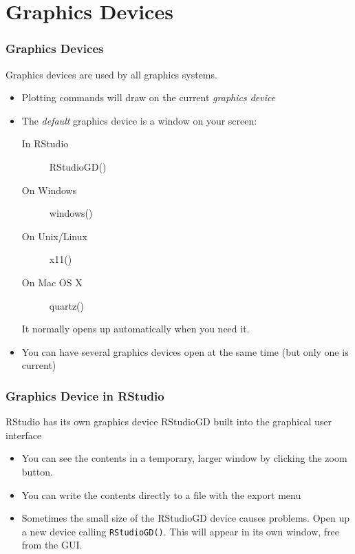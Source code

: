 \documentclass[xcolor=svgnames]{beamer}
\begin{document}
\section{Graphics Devices}

\begin{frame}
  \frametitle{Graphics Devices}
  Graphics devices are used by all graphics systems.
  \begin{itemize}      
  \item Plotting commands will draw on the current {\em graphics device}
  \item The {\em default} graphics device is a window on your screen:
  \begin{description}
  \item[In RStudio] RStudioGD()
  \item[On Windows] windows()
  \item[On Unix/Linux] x11()
  \item[On Mac OS X] quartz()
  \end{description}
  It normally opens up automatically when you need it.
  \item You can have several graphics devices open at the same time (but
    only one is current)
  \end{itemize}
\end{frame}

\begin{frame}
  \frametitle{Graphics Device in RStudio}

  RStudio has its own graphics device RStudioGD built into the graphical
  user interface
  \begin{itemize}
     \item You can see the contents in a temporary, larger window
     by clicking the zoom button.
     \item You can write the contents directly to a file with the export
     menu
     \item Sometimes the small size of the RStudioGD device causes problems. Open
     up a new device calling \texttt{RStudioGD()}. This will appear in
     its own window, free from the GUI.
  \end{itemize}

\end{frame}
\end{document}
